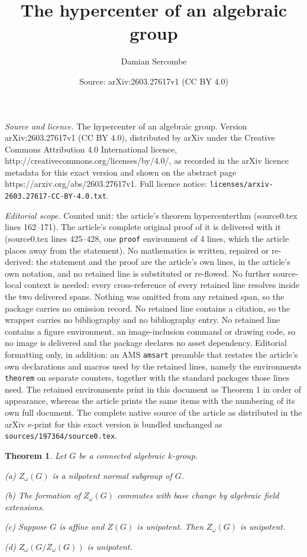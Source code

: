 \documentclass[10pt,a4paper]{amsart}
\title{The hypercenter of an algebraic group}
\author{Damian Sercombe}
\date{Source: arXiv:2603.27617v1 (CC BY 4.0)}
\newtheorem{theorem}{Theorem}
\begin{document}
\maketitle

\noindent\emph{Source and licence.} The hypercenter of an algebraic group. Version arXiv:2603.27617v1 (CC BY 4.0), distributed by arXiv under the Creative Commons Attribution 4.0 International licence, http://creativecommons.org/licenses/by/4.0/, as recorded in the arXiv licence metadata for this exact version and shown on the abstract page https://arxiv.org/abs/2603.27617v1. Full licence notice: \texttt{licenses/arxiv-2603.27617-CC-BY-4.0.txt}.\par\smallskip

\noindent\textit{Editorial scope.} Counted unit: the article's theorem hypercenterthm (source0.tex lines 162--171). The article's complete original proof of it is delivered with it (source0.tex lines 425--428, one \texttt{proof} environment of 4 lines, which the article places away from the statement). No mathematics is written, repaired or re-derived: the statement and the proof are the article's own lines, in the article's own notation, and no retained line is substituted or re-flowed.  No further source-local context is needed: every cross-reference of every retained line resolves inside the two delivered spans.  Nothing was omitted from any retained span, so the package carries no omission record.  No retained line contains a citation, so the wrapper carries no bibliography and no bibliography entry.  No retained line contains a figure environment, an image-inclusion command or drawing code, so no image is delivered and the package declares no asset dependency.  Editorial formatting only, in addition: an AMS \texttt{amsart} preamble that restates the article's own declarations and macros used by the retained lines, namely the environments \texttt{theorem} on separate counters, together with the standard packages those lines need.  The retained environments print in this document as Theorem 1 in order of appearance, whereas the article prints the same items with the numbering of its own full document.  The complete native source of the article as distributed in the arXiv e-print for this exact version is bundled unchanged as \texttt{sources/197364/source0.tex}.
\begin{theorem}\label{hypercenterthm} Let $G$ be a connected algebraic $k$-group.

\vspace{1mm}\noindent (a) $Z_\omega(G)$ is a nilpotent normal subgroup of $G$.

\vspace{1mm}\noindent (b) The formation of $Z_\omega(G)$ commutes with base change by algebraic field extensions.

\vspace{1mm}\noindent (c) Suppose $G$ is affine and $Z(G)$ is unipotent. Then $Z_\omega(G)$ is unipotent.

\vspace{1mm}\noindent (d) $Z_{\omega}(G/Z_\omega(G))$ is unipotent. %
\end{theorem}
\end{document}
